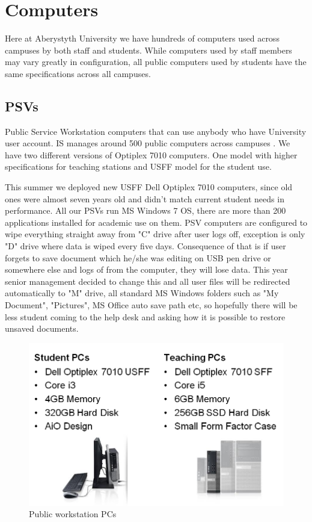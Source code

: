 \documentclass[10pt,a4paper,headinclude=true]{report}
\begin{document}
\section{Computers}
Here at Aberystyth University we have hundreds of computers used across campuses by both staff and students. While computers used by staff members may vary greatly in configuration, all public computers used by students have the same specifications across all campuses.
\subsection{PSVs}
Public Service Workstation computers that can use anybody who have University user account. IS manages around 500 public computers across campuses \cite{PSVs2}. We have two different versions of Optiplex 7010 computers. One model with higher specifications for teaching stations and USFF model for the student use. 

This summer we deployed new USFF Dell Optiplex 7010 \cite{PSVs} computers, since old ones were almost seven years old and didn't match current student needs in performance. All our PSVs run MS Windows 7 OS, there are more than 200 applications installed for academic use on them. PSV computers are configured to wipe everything straight away from "C" drive after user logs off, exception is only "D" drive where data is wiped every five days. Consequence of that is if user forgets to save document which he/she was editing on USB pen drive or somewhere else and logs of from the computer, they will lose data. This year senior management decided to change this and all user files will be redirected automatically to "M" drive, all standard MS Windows folders such as "My Document", "Pictures", MS Office auto save path etc, so hopefully there will be less student coming to the help desk and asking how it is possible to restore unsaved documents.
\begin{figure}[H]
\centering
\centerline{\includegraphics[scale=0.5]{./PSVs}}
\caption{Public workstation PCs \cite{PSVs}}
\label{fig:PSVs}
\end{figure}
\end{document}
